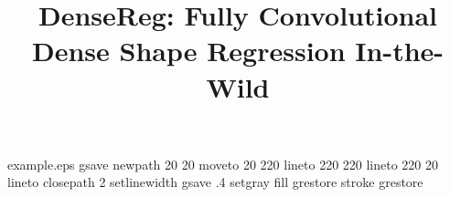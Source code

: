 %
%
%
%
%
\begin{filecontents*}{example.eps}
gsave
newpath
  20 20 moveto
  20 220 lineto
  220 220 lineto
  220 20 lineto
closepath
2 setlinewidth
gsave
  .4 setgray fill
grestore
stroke
grestore
\end{filecontents*}
%
\RequirePackage{fix-cm}
%
\documentclass[twocolumn]{svjour3}          %
%
\smartqed  %
%

\usepackage{graphicx}
\usepackage{bm}
\usepackage{subfig}
\usepackage{amssymb}
\usepackage{gensymb}
\usepackage{natbib}




\usepackage[pagebackref=true,breaklinks=true,letterpaper=true,colorlinks,bookmarks=false]{hyperref}




%
%
%
%
%


\title{DenseReg: Fully Convolutional Dense Shape Regression In-the-Wild}

